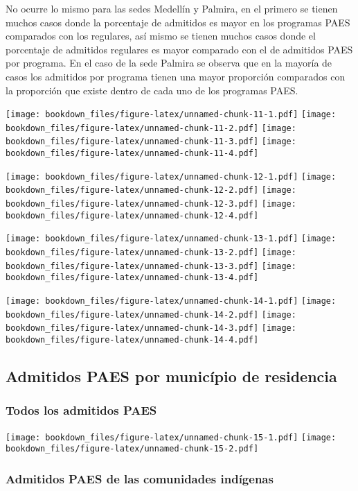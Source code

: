 \documentclass[]{article}
\theoremstyle{definition}
\theoremstyle{definition}
\theoremstyle{definition}
\theoremstyle{remark}
\begin{document}
No ocurre lo mismo para las sedes Medellín y Palmira, en el primero se
tienen muchos casos donde la porcentaje de admitidos es mayor en los
programas PAES comparados con los regulares, así mismo se tienen muchos
casos donde el porcentaje de admitidos regulares es mayor comparado con
el de admitidos PAES por programa. En el caso de la sede Palmira se
observa que en la mayoría de casos los admitidos por programa tienen una
mayor proporción comparados con la proporción que existe dentro de cada
uno de los programas PAES.

\texttt{[image: bookdown\_files/figure-latex/unnamed-chunk-11-1.pdf]}
\texttt{[image: bookdown\_files/figure-latex/unnamed-chunk-11-2.pdf]}
\texttt{[image: bookdown\_files/figure-latex/unnamed-chunk-11-3.pdf]}
\texttt{[image: bookdown\_files/figure-latex/unnamed-chunk-11-4.pdf]}

\texttt{[image: bookdown\_files/figure-latex/unnamed-chunk-12-1.pdf]}
\texttt{[image: bookdown\_files/figure-latex/unnamed-chunk-12-2.pdf]}
\texttt{[image: bookdown\_files/figure-latex/unnamed-chunk-12-3.pdf]}
\texttt{[image: bookdown\_files/figure-latex/unnamed-chunk-12-4.pdf]}

\texttt{[image: bookdown\_files/figure-latex/unnamed-chunk-13-1.pdf]}
\texttt{[image: bookdown\_files/figure-latex/unnamed-chunk-13-2.pdf]}
\texttt{[image: bookdown\_files/figure-latex/unnamed-chunk-13-3.pdf]}
\texttt{[image: bookdown\_files/figure-latex/unnamed-chunk-13-4.pdf]}

\texttt{[image: bookdown\_files/figure-latex/unnamed-chunk-14-1.pdf]}
\texttt{[image: bookdown\_files/figure-latex/unnamed-chunk-14-2.pdf]}
\texttt{[image: bookdown\_files/figure-latex/unnamed-chunk-14-3.pdf]}
\texttt{[image: bookdown\_files/figure-latex/unnamed-chunk-14-4.pdf]}

\subsection{Admitidos PAES por município de
residencia}\label{admitidos-paes-por-municipio-de-residencia}

\subsubsection{Todos los admitidos PAES}\label{todos-los-admitidos-paes}

\texttt{[image: bookdown\_files/figure-latex/unnamed-chunk-15-1.pdf]}
\texttt{[image: bookdown\_files/figure-latex/unnamed-chunk-15-2.pdf]}

\subsubsection{Admitidos PAES de las comunidades
indígenas}\label{admitidos-paes-de-las-comunidades-indigenas}
\end{document}
